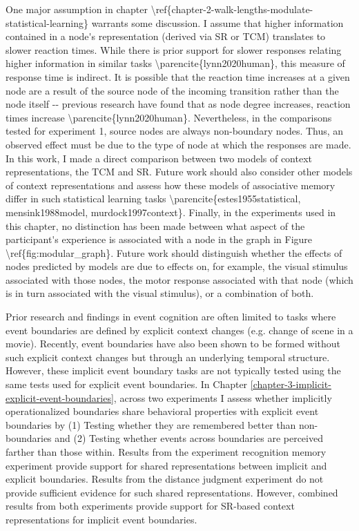 \ac{One major assumption in chapter \ref{chapter-2-walk-lengths-modulate-statistical-learning} warrants some discussion. I assume that higher information contained in a node's representation (derived via SR or TCM) translates to slower reaction times. While there is prior support for slower responses relating higher information in similar tasks \parencite{lynn2020human}, this measure of response time is indirect. It is possible that the reaction time increases at a given node are a result of the source node of the incoming transition rather than the node itself -- previous research have found that as node degree increases, reaction times increase \parencite{lynn2020human}. Nevertheless, in the comparisons tested for experiment 1, source nodes are always non-boundary nodes. Thus, an observed effect must be due to the type of node at which the responses are made. In this work, I made a direct comparison between two models of context representations, the TCM and SR. Future work should also consider other models of context representations and assess how these models of associative memory differ in such statistical learning tasks \parencite{estes1955statistical, mensink1988model, murdock1997context}. Finally, in the experiments used in this chapter, no distinction has been made between what aspect of the participant's experience is associated with a node in the graph in Figure \ref{fig:modular_graph}. Future work should distinguish whether the effects of nodes predicted by models are due to effects on, for example, the visual stimulus associated with those nodes, the motor response associated with that node (which is in turn associated with the visual stimulus), or a combination of both.}

Prior research and findings in event cognition are often limited to tasks where event boundaries are defined by explicit context changes (e.g. change of scene in a movie). Recently, event boundaries have also been shown to be formed without such explicit context changes but through an underlying temporal structure. However, these implicit event boundary tasks are not typically tested using the same tests used for explicit event boundaries. In Chapter \ref{chapter-3-implicit-explicit-event-boundaries}, across two experiments I assess whether implicitly operationalized boundaries share behavioral properties with explicit event boundaries by (1) Testing whether they are remembered better than non-boundaries and (2) Testing whether events across boundaries are perceived farther than those within. Results from the experiment recognition memory experiment provide support for shared representations between implicit and explicit boundaries. Results from the distance judgment experiment do not provide sufficient evidence for such shared representations. However, combined results from both experiments provide support for SR-based context representations for implicit event boundaries.

